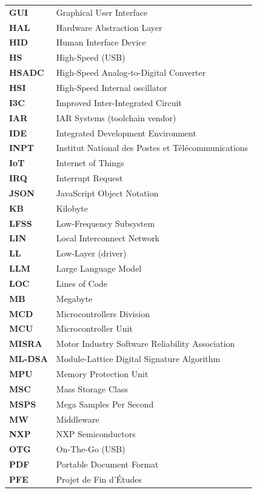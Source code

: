 \begin{longtable}{@{}p{}p{}@{}}
\textbf{GUI} & Graphical User Interface \\
\textbf{HAL} & Hardware Abstraction Layer \\
\textbf{HID} & Human Interface Device \\
\textbf{HS} & High-Speed (USB) \\
\textbf{HSADC} & High-Speed Analog-to-Digital Converter \\
\textbf{HSI} & High-Speed Internal oscillator \\
\textbf{I3C} & Improved Inter-Integrated Circuit \\
\textbf{IAR} & IAR Systems (toolchain vendor) \\
\textbf{IDE} & Integrated Development Environment \\
\textbf{INPT} & Institut National des Postes et T\'el\'ecommunications \\
\textbf{IoT} & Internet of Things \\
\textbf{IRQ} & Interrupt Request \\
\textbf{JSON} & JavaScript Object Notation \\
\textbf{KB} & Kilobyte \\
\textbf{LFSS} & Low-Frequency Subsystem \\
\textbf{LIN} & Local Interconnect Network \\
\textbf{LL} & Low-Layer (driver) \\
\textbf{LLM} & Large Language Model \\
\textbf{LOC} & Lines of Code \\
\textbf{MB} & Megabyte \\
\textbf{MCD} & Microcontrollers Division \\
\textbf{MCU} & Microcontroller Unit \\
\textbf{MISRA} & Motor Industry Software Reliability Association \\
\textbf{ML-DSA} & Module-Lattice Digital Signature Algorithm \\
\textbf{MPU} & Memory Protection Unit \\
\textbf{MSC} & Mass Storage Class \\
\textbf{MSPS} & Mega Samples Per Second \\
\textbf{MW} & Middleware \\
\textbf{NXP} & NXP Semiconductors \\
\textbf{OTG} & On-The-Go (USB) \\
\textbf{PDF} & Portable Document Format \\
\textbf{PFE} & Projet de Fin d'\'Etudes \\

\end{longtable}
